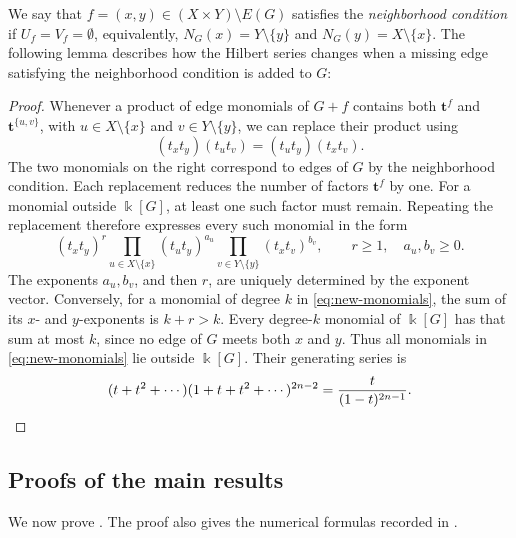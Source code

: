 \documentclass[a4paper,reqno,11pt]{amsart}
\newtheorem{lem}[thm]{Lemma}
\theoremstyle{definition}
\theoremstyle{remark}
\numberwithin{equation}{section}
\newcommand{\kk}{\Bbbk}
\newcommand{\tb}{\mathbf t}
\newcommand{\Hilb}{\operatorname{Hilb}}
\begin{document}
We say that $f=(x,y)\in (X\times Y)\setminus E(G)$ satisfies the \textit{neighborhood condition} if $U_f=V_f=\emptyset$, equivalently, $N_G(x)=Y\setminus \{y\}$ and $N_G(y)=X\setminus \{x\}$.
The following lemma describes how the Hilbert series changes when a missing edge satisfying the neighborhood condition is added to $G$:

\begin{proof}
    Whenever a product of edge monomials of $G+f$ contains both $\tb^f$ and $\tb^{\{u,v\}}$, with $u\in X\setminus\{x\}$ and $v\in Y\setminus\{y\}$, we can replace their product using
    \[
        (t_xt_y)(t_ut_v)=(t_ut_y)(t_xt_v).
    \]
    The two monomials on the right correspond to edges of $G$ by the neighborhood condition.
    Each replacement reduces the number of factors $\tb^f$ by one.
    For a monomial outside $\kk[G]$, at least one such factor must remain.
    Repeating the replacement therefore expresses every such monomial in the form
    \begin{equation}\label{eq:new-monomials}
        (t_xt_y)^r\prod_{u\in X\setminus\{x\}}(t_ut_y)^{a_u}
        \prod_{v\in Y\setminus\{y\}}(t_xt_v)^{b_v},
        \qquad r\ge1,\quad a_u,b_v\ge0.
    \end{equation}
    The exponents $a_u,b_v$, and then $r$, are uniquely determined by the exponent vector.
    Conversely, for a monomial of degree $k$ in \eqref{eq:new-monomials}, the sum of its $x$- and $y$-exponents is $k+r>k$.
    Every degree-$k$ monomial of $\kk[G]$ has that sum at most $k$, since no edge of $G$ meets both $x$ and $y$.
    Thus all monomials in \eqref{eq:new-monomials} lie outside $\kk[G]$.
    Their generating series is
    \[
        (t+t^2+\cdots)(1+t+t^2+\cdots)^{2n-2}
        =\frac{t}{(1-t)^{2n-1}}.\qedhere
    \]
\end{proof}

\subsection{Proofs of the main results}\label{subsec:proofs}

We now prove .
The proof also gives the numerical formulas recorded in .
\end{document}
